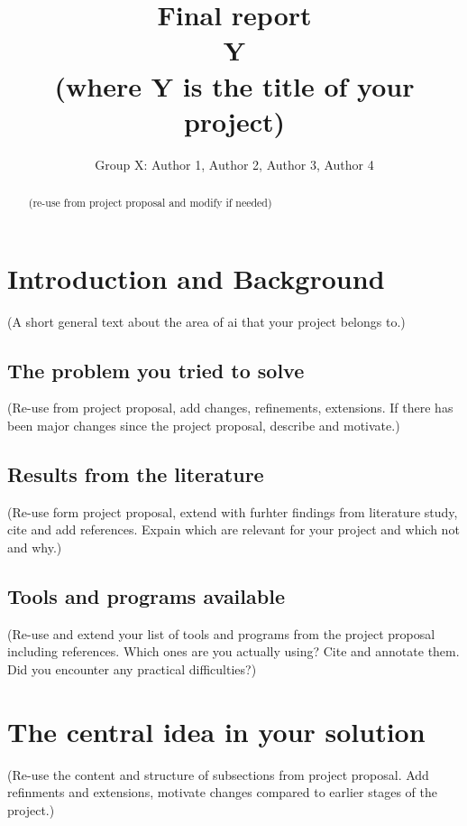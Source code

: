 \documentclass[a4paper,11pt]{article}
\begin{document}
\title{Final report\\ Y \\ (where Y is the title of your project)}
\author{Group X: Author 1, Author 2, Author 3, Author 4}
\maketitle
\begin{abstract}\centering
(re-use from project proposal and modify if needed)
\end{abstract}

\section{Introduction and Background}
(A short general text about the area of ai that your project belongs to.)

\subsection{The problem you tried to solve}
(Re-use from project proposal, add changes, refinements,
extensions. If there has been major changes since the project
proposal, describe and motivate.)

\subsection{Results from the literature}
(Re-use form project proposal, extend with furhter findings from
literature study, cite and add references. Expain which are relevant
for your project and which not and why.)

\subsection{Tools and programs available}
(Re-use and extend your list of tools and programs from the project
proposal including references. 
Which ones are you actually using?  Cite and annotate them.  
Did you encounter any practical difficulties?)

\section{The central idea in your solution}
(Re-use the content and structure of subsections from project
proposal. Add refinments and extensions, motivate changes compared
to earlier stages of the project.)
\end{document}

